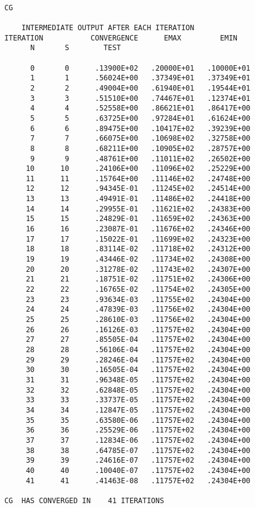 \begin{verbatim}

 CG
 
     INTERMEDIATE OUTPUT AFTER EACH ITERATION
 ITERATION           CONVERGENCE      EMAX         EMIN
       N       S        TEST
 
       0       0      .13900E+02   .20000E+01   .10000E+01
       1       1      .56024E+00   .37349E+01   .37349E+01
       2       2      .49004E+00   .61940E+01   .19544E+01
       3       3      .51510E+00   .74467E+01   .12374E+01
       4       4      .52558E+00   .86621E+01   .86417E+00
       5       5      .63725E+00   .97284E+01   .61624E+00
       6       6      .89475E+00   .10417E+02   .39239E+00
       7       7      .66075E+00   .10698E+02   .32758E+00
       8       8      .68211E+00   .10905E+02   .28757E+00
       9       9      .48761E+00   .11011E+02   .26502E+00
      10      10      .24106E+00   .11096E+02   .25229E+00
      11      11      .15764E+00   .11146E+02   .24748E+00
      12      12      .94345E-01   .11245E+02   .24514E+00
      13      13      .49491E-01   .11486E+02   .24418E+00
      14      14      .29955E-01   .11621E+02   .24383E+00
      15      15      .24829E-01   .11659E+02   .24363E+00
      16      16      .23087E-01   .11676E+02   .24346E+00
      17      17      .15022E-01   .11699E+02   .24323E+00
      18      18      .83114E-02   .11718E+02   .24312E+00
      19      19      .43446E-02   .11734E+02   .24308E+00
      20      20      .31278E-02   .11743E+02   .24307E+00
      21      21      .18751E-02   .11751E+02   .24306E+00
      22      22      .16765E-02   .11754E+02   .24305E+00
      23      23      .93634E-03   .11755E+02   .24304E+00
      24      24      .47839E-03   .11756E+02   .24304E+00
      25      25      .28610E-03   .11756E+02   .24304E+00
      26      26      .16126E-03   .11757E+02   .24304E+00
      27      27      .85505E-04   .11757E+02   .24304E+00
      28      28      .56106E-04   .11757E+02   .24304E+00
      29      29      .28246E-04   .11757E+02   .24304E+00
      30      30      .16505E-04   .11757E+02   .24304E+00
      31      31      .96348E-05   .11757E+02   .24304E+00
      32      32      .62848E-05   .11757E+02   .24304E+00
      33      33      .33737E-05   .11757E+02   .24304E+00
      34      34      .12847E-05   .11757E+02   .24304E+00
      35      35      .63580E-06   .11757E+02   .24304E+00
      36      36      .25529E-06   .11757E+02   .24304E+00
      37      37      .12834E-06   .11757E+02   .24304E+00
      38      38      .64785E-07   .11757E+02   .24304E+00
      39      39      .24616E-07   .11757E+02   .24304E+00
      40      40      .10040E-07   .11757E+02   .24304E+00
      41      41      .41463E-08   .11757E+02   .24304E+00
 
 CG  HAS CONVERGED IN    41 ITERATIONS
\end{verbatim}
